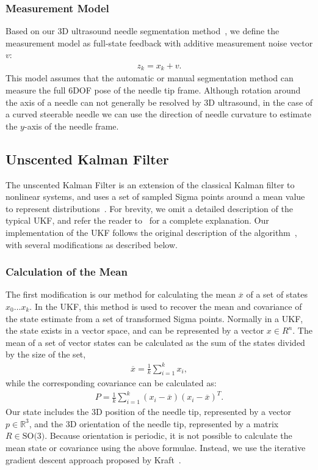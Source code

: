 \subsubsection{Measurement Model}
Based on our 3D ultrasound needle segmentation method~\cite{Adebar2013}, we define the measurement model as full-state feedback with additive measurement noise vector ${v}$:
\begin{align}
{z_{k}} = {x_k} + {v}.
\end{align}
This model assumes that the automatic or manual segmentation method can measure the full 6DOF pose of the needle tip frame. Although rotation around the axis of a needle can not generally be resolved by 3D ultrasound, in the case of a curved steerable needle we can use the direction of needle curvature to estimate the $y$-axis of the needle frame.

\subsection{Unscented Kalman Filter}
The unscented Kalman Filter is an extension of the classical Kalman filter to nonlinear systems, and uses a set of sampled Sigma points around a mean value to represent distributions~\cite{Julier1997}. For brevity, we omit a detailed description of the typical UKF, and refer the reader to~\cite{Thrun2005} for a complete explanation. Our implementation of the UKF follows the original description of the algorithm~\cite{Julier1997}, with several modifications as described below. 

\subsubsection{Calculation of the Mean}
The first modification is our method for calculating the mean $\overline{x}$ of a set of states $x_0 \dots x_k$. In the UKF, this method is used to recover the mean and covariance of the state estimate from a set of transformed Sigma points. Normally in a UKF, the state exists in a vector space, and can be represented by a vector $x \in R^n$. The mean of a set of vector states can be calculated as the sum of the states divided by the size of the set,
\begin{align}
\overline{x} = \frac{1}{k}\sum\limits_{i=1}^{k} x_i,
\end{align}
\noindent 
while the corresponding covariance can be calculated as:
\begin{align}
P = \frac{1}{k}\sum\limits_{i=1}^{k} (x_i-\overline{x})(x_i-\overline{x})^T.
\end{align}
\noindent
Our state includes the 3D position of the needle tip, represented by a vector ${p} \in \mathbb{R}^3$, and the 3D orientation of the needle tip, represented by a matrix ${R} \in \textrm{SO(3)}$. Because orientation is periodic, it is not possible to calculate the mean state or covariance using the above formulae. Instead, we use the iterative gradient descent approach proposed by Kraft~\cite{Kraft2003}. 


